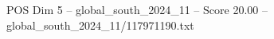 \begin{textsample}{POS Dim 5 – global\_south\_2024\_11 – Score 20.00 – global\_south\_2024\_11/117971190.txt}
\end{textsample}

